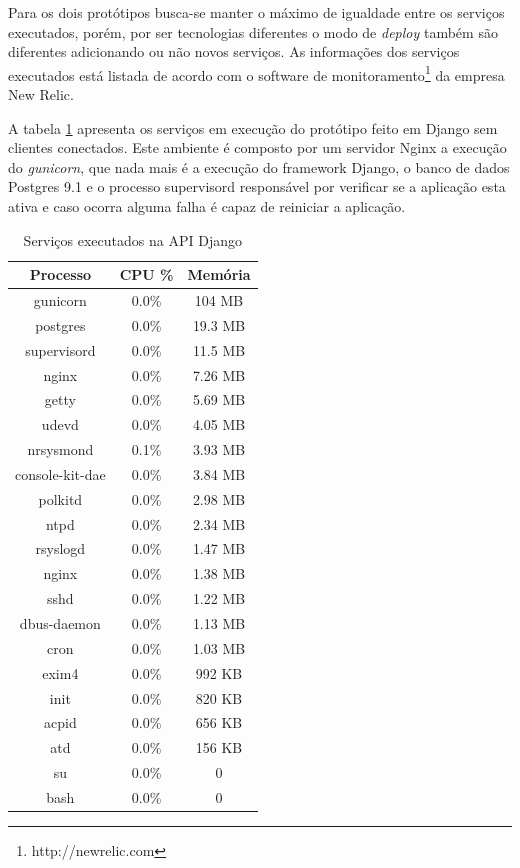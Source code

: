   Para os dois protótipos busca-se manter o máximo de igualdade entre os serviços executados, porém, por ser 
  tecnologias diferentes o modo de \textit{deploy} também são diferentes adicionando ou não novos serviços. 
  As informações dos serviços executados está listada de acordo com o software de monitoramento\footnote{http://newrelic.com}
  da empresa New Relic.
  
  A tabela \ref{tab:services-in-api-django} apresenta os serviços em execução do protótipo feito em Django sem clientes conectados.
  Este ambiente é composto por um servidor Nginx a execução do \textit{gunicorn},
  que nada mais é a execução do framework Django, o banco de dados Postgres 9.1 e o processo supervisord responsável por
  verificar se a aplicação esta ativa e caso ocorra alguma falha é capaz de reiniciar a aplicação.
  
  \begin{table}[H]
    \centering
    \footnotesize
    \setlength{\abovecaptionskip}{0pt}
    \setlength{\belowcaptionskip}{0pt}
    \caption[Serviços executados na API Django]{Serviços executados na API Django}
    \label{tab:services-in-api-django}
    \begin{tabular}{c|c|c}
      \hline \hline
      Processo  & 	CPU \% &	Memória \\
      \hline \hline
      gunicorn &	0.0\% &		104 MB \\
      postgres &	0.0\% &		19.3 MB \\
      supervisord &	0.0\% &		11.5 MB \\
      nginx &		0.0\% &		7.26 MB \\
      getty &		0.0\% &		5.69 MB \\
      udevd &		0.0\% &		4.05 MB \\
      nrsysmond &	0.1\% &		3.93 MB \\
      console-kit-dae &	0.0\% &		3.84 MB \\
      polkitd &	 	0.0\% &		2.98 MB \\
      ntpd &		0.0\% &		2.34 MB \\
      rsyslogd &	0.0\% &		1.47 MB \\
      nginx &		0.0\% &		1.38 MB \\
      sshd &		0.0\% &		1.22 MB \\
      dbus-daemon &	0.0\% &		1.13 MB \\
      cron &		0.0\% &		1.03 MB \\
      exim4 &		0.0\% &		992 KB \\
      init &		0.0\% &		820 KB \\
      acpid &		0.0\% &		656 KB \\
      atd &		0.0\% &		156 KB \\
      su &		0.0\% &		0 \\
      bash &		0.0\% &		0 \\
      \hline \hline
    \end{tabular}
  \end{table}
  
